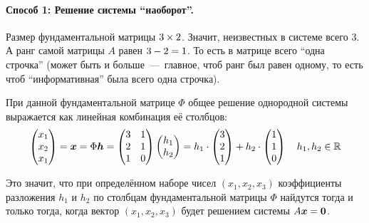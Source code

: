 \documentclass[a4paper,12pt]{article}
\begin{document}
  \begin{solution}
    \hphantom{X}\par  %
    
    \paragraph{Способ 1: Решение системы ``наоборот''.}
    
    Размер фундаментальной матрицы $3 \hm\times 2$.
    Значит, неизвестных в системе всего $3$.
    А ранг самой матрицы $A$ равен $3 \hm- 2 \hm= 1$.
    То есть в матрице всего ``одна строчка'' (может быть и больше~---~главное, чтоб ранг был равен одному, то есть чтоб ``информативная'' была всего одна строчка).
    
    При данной фундаментальной матрице $\Phi$ общее решение однородной системы выражается как линейная комбинация её столбцов:
    \begin{equation*}
    \begin{split}
      \begin{pmatrix} x_1 \\ x_2 \\ x_1 \end{pmatrix}
      = \boldsymbol x = \Phi \boldsymbol h = \begin{pmatrix}
          3 & 1\\
          2 & 1\\
          1 & 0
        \end{pmatrix} \begin{pmatrix}
          h_1 \\ h_2
        \end{pmatrix}
      = h_1 \cdot \begin{pmatrix} 3 \\ 2 \\ 1 \end{pmatrix} +
         h_2 \cdot \begin{pmatrix} 1 \\ 1 \\ 0 \end{pmatrix} \quad h_1, h_2 \in \operatorname{\mathbb R}
    \end{split}
    \end{equation*}
    
    Это значит, что при определённом наборе чисел $(x_1, x_2, x_3)$ коэффициенты разложения $h_1$ и $h_2$ по столбцам фундаментальной матрицы $\Phi$ найдутся тогда и только тогда, когда вектор $(x_1, x_2, x_3)$ будет решением системы $A \bds x \hm= \bds 0$.
    

\end{solution}
\end{document}
